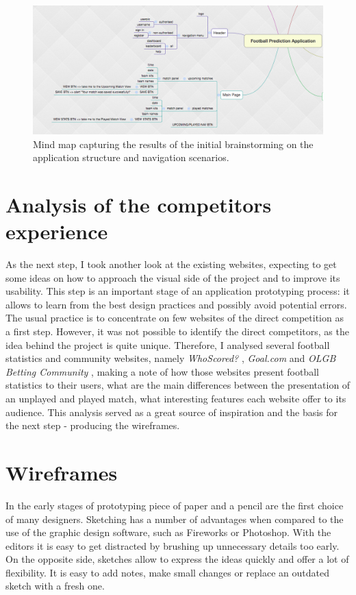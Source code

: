 \begin{figure}[H]
	\begin{center}
		\includegraphics[width=.90\textwidth]{design/images/mindmap}
		\caption{Mind map capturing the results of the initial brainstorming on the application structure and navigation scenarios.}
		\label{fig:using:mindmap}
	\end{center}
\end{figure}

\section{Analysis of the competitors experience}
\label{sec:competitors_prototype}
As the next step, I took another look at the existing websites, expecting to get some ideas on how to approach the visual side of the project and to improve its usability. This step is an important stage of an application prototyping process: it allows to learn from the best design practices and possibly avoid potential errors. The usual practice is to concentrate on few websites of the direct competition as a first step. However, it was not possible to identify the direct competitors, as the idea behind the project is quite unique. Therefore, I analysed several football statistics and community websites, namely \emph{WhoScored?} \citep{source:whoscored}, \emph{Goal.com} \citep{source:goal} and \emph{OLGB Betting Community} \citep{source:olgb}, making a note of how those websites present football statistics to their users, what are the main differences between the presentation of an unplayed and played match, what interesting features each website offer to its audience. This analysis served as a great source of inspiration and the basis for the next step - producing the wireframes.

\section{Wireframes}
\label{sec:wireframes_prototype}
In the early stages of prototyping piece of paper and a pencil are the first choice of many designers. Sketching has a number of advantages when compared to the use of the graphic design software, such as Fireworks or Photoshop. With the editors it is easy to get distracted by brushing up unnecessary details too early. On the opposite side, sketches allow to express the ideas quickly and offer a lot of flexibility. It is easy to add notes, make small changes or replace an outdated sketch with a fresh one.

